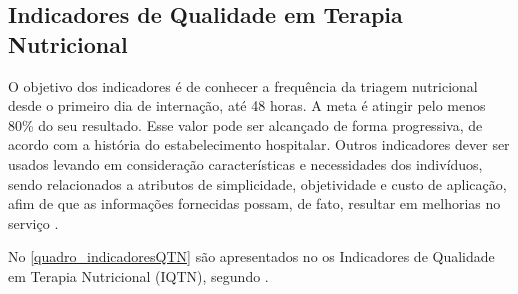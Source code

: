 \subsection{Indicadores de Qualidade em Terapia Nutricional} \label{subD-indicadores}
O objetivo dos indicadores é de conhecer a frequência da triagem nutricional desde o primeiro dia de internação, até 48 horas. A meta é atingir pelo menos 80\% do seu resultado. Esse valor pode ser alcançado de forma progressiva, de acordo com a história do estabelecimento hospitalar. Outros indicadores dever ser usados levando em consideração características e necessidades dos indivíduos, sendo relacionados a atributos de simplicidade, objetividade e custo de aplicação, afim de que as informações fornecidas possam, de fato, resultar em melhorias no serviço \cite{manualnutricao2016}.

No \autoref{quadro_indicadoresQTN} são apresentados no   os Indicadores de Qualidade em Terapia Nutricional (IQTN), segundo .

